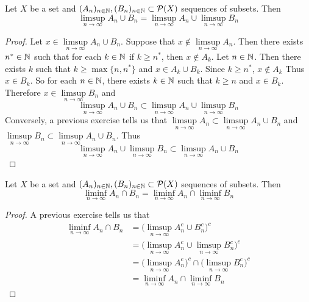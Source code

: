 \documentclass{book}
\begin{document}
	\begin{ex}  
		Let $X$ be a set and $(A_n)_{n \in \mathbb{N}}, (B_n)_{n \in \mathbb{N}} \subset \mathcal{P}(X)$ sequences of subsets. Then $$\limsup\limits_{n \rightarrow \infty} A_n \cup B_n= \limsup\limits_{n \rightarrow \infty} A_n \cup \limsup\limits_{n \rightarrow \infty} B_n$$
	\end{ex}
	
	\begin{proof}
		Let $x \in \limsup\limits_{n \rightarrow \infty} A_n \cup B_n$. Suppose that $x \not \in \limsup\limits_{n \rightarrow \infty} A_n$. Then there exists $n^* \in \mathbb{N}$ such that for each $k \in \mathbb{N}$ if $ k \geq n^*$, then $x \not \in A_k$. Let $n \in \mathbb{N}$. Then there exists $k$ such that $k \geq \max\{n, n^*\}$ and $x \in A_{k} \cup B_k$. Since $k \geq n^*$, $x \not \in A_{k}$ Thus $x \in B_k$. So for each $n \in \mathbb{N}$, there exists $k \in \mathbb{N}$ such that $k \geq n$ and $x \in B_k$. Therefore $x \in \limsup\limits_{n \rightarrow \infty}  B_n$ and $$\limsup\limits_{n \rightarrow \infty} A_n \cup B_n \subset \limsup\limits_{n \rightarrow \infty} A_n \cup \limsup\limits_{n \rightarrow \infty} B_n$$ Conversely, a previous exercise tells us that $\limsup\limits_{n \rightarrow \infty} A_n \subset \limsup\limits_{n \rightarrow \infty} A_n \cup B_n$ and $\limsup\limits_{n \rightarrow \infty}  B_n \subset \limsup\limits_{n \rightarrow \infty} A_n \cup B_n$. Thus $$ \limsup\limits_{n \rightarrow \infty} A_n \cup \limsup\limits_{n \rightarrow \infty} B_n \subset \limsup\limits_{n \rightarrow \infty} A_n \cup B_n$$
	\end{proof}
	
	\begin{ex}  
		Let $X$ be a set and $(A_n)_{n \in \mathbb{N}}, (B_n)_{n \in \mathbb{N}} \subset \mathcal{P}(X)$ sequences of subsets. Then $$\liminf\limits_{n \rightarrow \infty} A_n \cap B_n= \liminf\limits_{n \rightarrow \infty} A_n \cap \liminf\limits_{n \rightarrow \infty} B_n$$
	\end{ex}
	
	\begin{proof}
		A previous exercise tells us that 
		\begin{align*}
			\liminf\limits_{n \rightarrow \infty} A_n \cap B_n
			&= \bigg( \limsup\limits_{n \rightarrow \infty} A_n^c \cup B_n^c \bigg)^c \\
			&= \bigg( \limsup\limits_{n \rightarrow \infty} A_n^c \cup \limsup\limits_{n \rightarrow \infty}B_n^c \bigg)^c \\
			&= \bigg( \limsup\limits_{n \rightarrow \infty} A_n^c \bigg)^c \cap \bigg( \limsup\limits_{n \rightarrow \infty}B_n^c \bigg)^c \\
			&= \liminf\limits_{n \rightarrow \infty} A_n \cap \liminf\limits_{n \rightarrow \infty}  B_n
		\end{align*}
	\end{proof}
	
\end{document}

